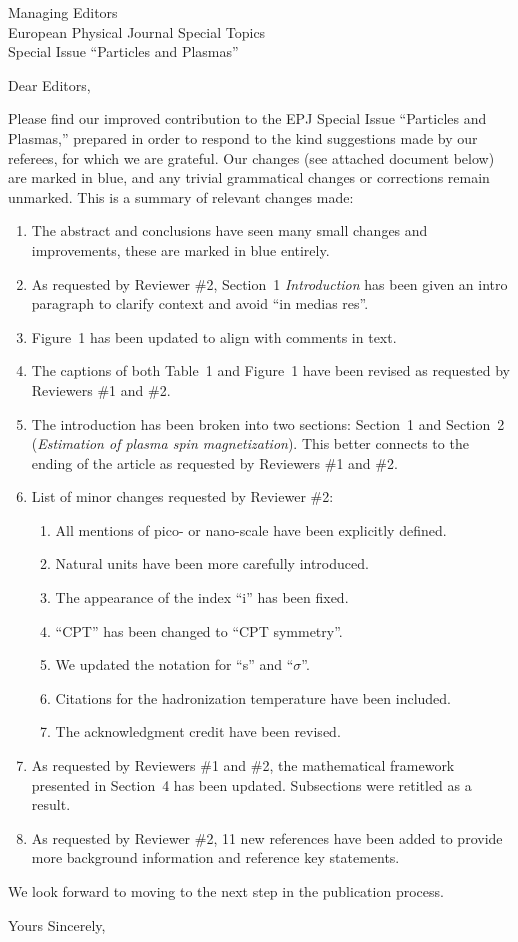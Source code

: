 \documentclass{letter}
\date{March 24, 2025}
\begin{document}
\begin{letter}{Managing Editors\\European Physical Journal Special Topics\\Special Issue ``Particles and Plasmas''}
\opening{Dear Editors,}
 
Please find our improved contribution to the EPJ Special Issue ``Particles and Plasmas,'' prepared in order to respond to the kind suggestions made by our referees, for which we are grateful. Our changes (see attached document below) are marked in blue, and any trivial grammatical changes or corrections remain unmarked. This is a summary of relevant changes made:

\begin{enumerate}
    \item The abstract and conclusions have seen many small changes and improvements, these are marked in blue entirely.
    \item As requested by Reviewer \#2, Section~1 \textit{Introduction} has been given an intro paragraph  to clarify context and avoid ``in medias res''.  
    \item Figure~1 has been updated to align with comments in text.
    \item The captions of both Table~1 and Figure~1 have been revised as requested by Reviewers \#1 and \#2.
    \item The introduction has been broken into two sections: Section~1 and Section~2 (\textit{Estimation of plasma spin magnetization}). This better connects to the ending of the article as requested by Reviewers \#1 and \#2.
    \item List of minor changes requested by Reviewer \#2:
    \begin{enumerate}
        \item All mentions of pico- or nano-scale have been explicitly defined.
        \item Natural units have been more carefully introduced.
        \item The appearance of the index ``i'' has been fixed.
        \item ``CPT'' has been changed to ``CPT symmetry''.
        \item We updated the notation for ``s'' and ``$\sigma$''.
        \item Citations for the hadronization temperature have been included.
        \item The acknowledgment credit have been revised.
    \end{enumerate}
    \item As requested by Reviewers \#1 and \#2, the mathematical framework presented in Section~4 has been updated. Subsections were retitled as a result. 
    \item As requested by Reviewer \#2, 11 new references have been added to provide more background information and reference key statements.
\end{enumerate}

We look forward to moving to the next step in the publication process.

\closing{Yours Sincerely,}

\end{letter}
\end{document}
